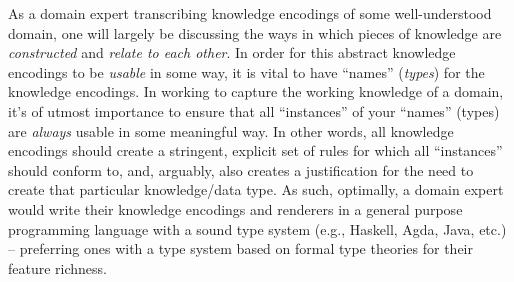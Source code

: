 As a domain expert transcribing knowledge encodings of some well-understood
domain, one will largely be discussing the ways in which pieces of knowledge are
\textit{constructed} and \textit{relate to each other}. In order for this
abstract knowledge encodings to be \textit{usable} in some way, it is vital to
have ``names'' (\textit{types}) for the knowledge encodings. In working to
capture the working knowledge of a domain, it's of utmost importance to ensure
that all ``instances'' of your ``names'' (types) are \textit{always} usable in
some meaningful way. In other words, all knowledge encodings should create a
stringent, explicit set of rules for which all ``instances'' should conform to,
and, arguably, also creates a justification for the need to create that
particular knowledge/data type. As such, optimally, a domain expert would write
their knowledge encodings and renderers in a general purpose programming
language with a sound type system (e.g., Haskell, Agda, Java, etc.) --
preferring ones with a type system based on formal type theories for their
feature richness.
